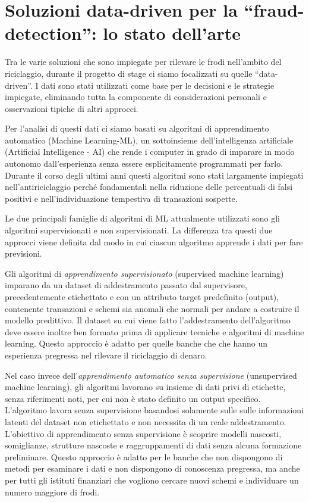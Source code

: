 \chapter{Soluzioni data-driven per la ``fraud-detection'': lo stato dell'arte}



Tra le varie soluzioni che sono impiegate per rilevare le frodi nell'ambito del riciclaggio, durante il progetto di stage ci siamo focalizzati su quelle ``data-driven''. I dati sono stati utilizzati come base per le decisioni e le strategie impiegate, eliminando tutta la componente di considerazioni personali e osservazioni tipiche di altri approcci.

Per l'analisi di questi dati ci siamo basati su algoritmi di apprendimento automatico (Machine Learning-ML),  un sottoinsieme dell'intelligenza artificiale (Artificial Intelligence - AI) che rende i computer in grado di imparare in modo autonomo dall'esperienza senza essere esplicitamente programmati per farlo.
Durante il corso degli ultimi anni questi algoritmi sono stati largamente impiegati nell'antiriciclaggio perché fondamentali nella riduzione delle percentuali di falsi positivi e nell'individuazione tempestiva di transazioni sospette.

Le due principali famiglie di algoritmi di ML attualmente utilizzati sono gli algoritmi supervisionati e non supervisionati. La differenza tra questi due approcci viene definita dal modo in cui ciascun algoritmo apprende i dati per fare previsioni. 

Gli algoritmi di \textit{apprendimento supervisionato} (supervised machine learning) imparano da un dataset di addestramento passato dal supervisore, precedentemente etichettato e con un attributo target predefinito (output), contenente transazioni e schemi sia anomali che normali per andare a costruire il modello predittivo. Il dataset su cui viene fatto l'addestramento dell'algoritmo deve essere inoltre ben formato prima di applicare tecniche e algoritmi di machine learning. 
Questo approccio è adatto per quelle banche che che hanno un esperienza pregressa nel rilevare il  riciclaggio di denaro. 


Nel caso invece dell'\textit{apprendimento automatico senza supervisione} (unsupervised machine learning), gli algoritmi lavorano su insieme di dati privi di etichette, senza riferimenti noti, per cui non è stato definito un output specifico.
L'algoritmo lavora senza supervisione basandosi solamente sulle sulle informazioni latenti del dataset non etichettato e non necessita di un reale addestramento.
L'obiettivo di apprendimento senza supervisione è scoprire modelli nascosti, somiglianze, strutture nascoste e raggruppamenti di dati senza alcuna formazione preliminare. Questo approccio è adatto per le banche che non dispongono di metodi per esaminare i dati e non dispongono di conoscenza pregressa, ma anche per tutti gli istituti finanziari che vogliono cercare nuovi schemi e individuare un numero maggiore di frodi.

